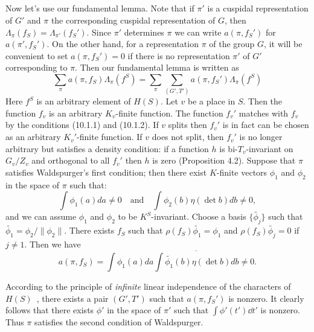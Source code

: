 \subsection{}
Now let's use our fundamental lemma.
Note that if $\pi'$ is a cuspidal representation of $G'$ and $\pi$ the corresponding cuspidal representation of $G$, then $\Lambda_\pi(f_S) = \Lambda_{\pi'}( f_{S}')$.
Since $\pi'$ determines $\pi$ we can write $a(\pi, f_S')$ for $a(\pi', f_S')$.
On the other hand, for a representation $\pi$ of the group $G$, it will be convenient to set $a(\pi, f_S')=0$ if there is no representation $\pi'$ of $G'$ corresponding to $\pi$.
Then our fundamental lemma is written as
\begin{equation}
    \label{eqn:11.4.1}
    \sum_{\pi} a(\pi, f_S)\Lambda_{\pi}(f^S) = \sum_{\pi} \sum_{(G', T')} a(\pi, f_S') \Lambda_{\pi}(f^S)
\end{equation}
Here $f^S$ is an arbitrary element of $H(S)$.
Let $v$ be a place in $S$.
Then the function $f_v$ is an arbitrary $K_v$-finite function.
The function $f_v'$ matches with $f_v$ by the conditions (10.1.1) and (10.1.2).
If $v$ splits then $f_v'$ is in fact can be chosen as an arbitrary $K_v'$-finite function.
If $v$ does not split, then $f_v'$ is no longer arbitrary but satisfies a density condition: if a function $h$ is bi-$T_v$-invariant on $G_v/Z_v$ and orthogonal to all $f_v'$ then $h$ is zero (Proposition 4.2).
Suppose that $\pi$ satisfies Waldspurger's first condition; then there exist $K$-finite vectors $\phi_1$ and $\phi_2$ in the space of $\pi$ such that:
\begin{equation*}
    \int \phi_1(a)da \neq 0 \quad \text{and}\quad \int \phi_2(b) \eta(\det b) db \neq 0,
\end{equation*}
and we can assume $\phi_1$ and $\phi_2$ to be $K^S$-invariant.
Choose a basis $\{\widetilde{\phi_j}\}$ such that $\widetilde{\phi_1} = \phi_2 / \|\phi_2\|$.
There exists $f_S$ such that $\rho(f_S)\widetilde{\phi_1} = \phi_1$ and $\rho(f_S) \widetilde{\phi_j} = 0$ if $j\neq 1$.
Then we have
\begin{equation*}
    a(\pi, f_S) = \int \phi_1(a) da  \overline{\int \widetilde{\phi_1}(b) \eta(\det b)db}\neq 0.
\end{equation*}

According to the principle of \emph{infinite} linear independence of the characters of $H(S)$~\cite{langlands1980base}, 
there exists a pair $(G', T')$ such that $a(\pi, f_S')$ is nonzero.
It clearly follows that there exists $\phi'$ in the space of $\pi'$ such that $\int \phi'(t') \dd t'$ is nonzero.
Thus $\pi$ satisfies the second condition of Waldspurger.

